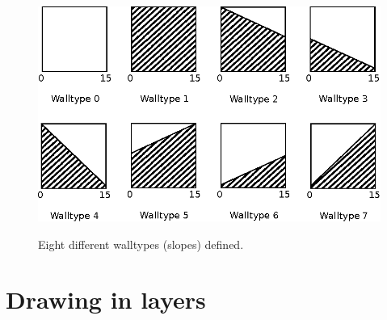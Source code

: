 \documentclass[book.tex]{subfiles}
\begin{document}
\begin{minipage}{\textwidth}
  
\end{minipage}
\label{wallclip_array}
\par
\begin{figure}[H]
  \centering
  \includegraphics[width=\textwidth]{imgs/drawings/walltype.eps}
  \label{fig:walltype}
  \caption{Eight different walltypes (slopes) defined.}
\end{figure}



\par
\begin{minipage}{\textwidth}
  
\end{minipage}
\label{wallclip_array}
\par

\section{Drawing in layers}
\end{document}
